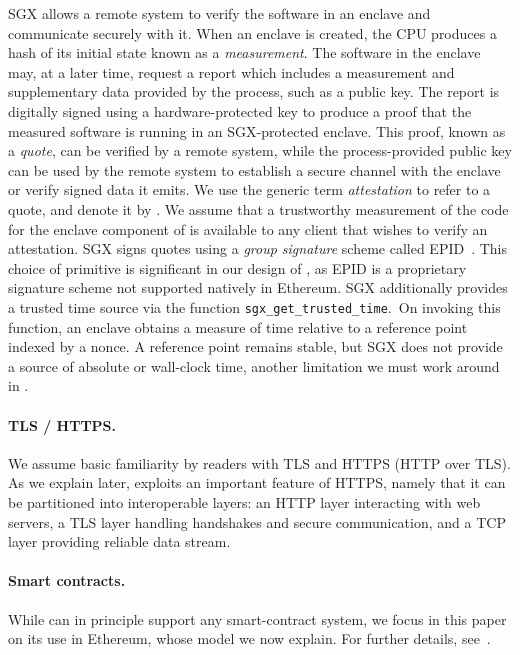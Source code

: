 SGX allows a remote system to verify the software in an enclave and communicate securely with it.
When an enclave is created, the CPU produces a hash of its initial state known as a {\em measurement}.
The software in the enclave may, at a later time, request a report which includes a measurement and supplementary data provided by the process, such as a public key.
The report is digitally signed using a hardware-protected key to produce a proof that the measured software is running in an SGX-protected enclave.
This proof, known as a {\em quote}, can be verified by a remote system, while the process-provided public key can be used by the remote system to establish a secure channel with the enclave or verify signed data it emits.
We use the generic term {\em attestation} to refer to a quote, and denote it by \att.
We assume that a trustworthy measurement of the code for the enclave component of \tc is available to any client that wishes to verify an attestation.
SGX signs quotes using a \emph{group signature} scheme called EPID~\cite{epid}.
This choice of primitive is significant in our design of \tcs, as EPID is a proprietary signature scheme not supported natively in Ethereum.
SGX additionally provides a trusted time source via the function \texttt{sgx\_get\_trusted\_time}.~On invoking this function, an enclave obtains a measure of time relative to a reference point indexed by a nonce.
A reference point remains stable, but SGX does not provide a source of absolute or wall-clock time, another limitation we must work around in \tc.

\paragraph{\bf TLS / HTTPS.}
We assume basic familiarity by readers with TLS and HTTPS (HTTP over TLS). As we explain later, \tc exploits an important feature of HTTPS, namely that it can be partitioned into interoperable layers: an HTTP layer interacting with web servers, a TLS layer handling handshakes and secure communication, and a TCP layer providing reliable data stream. 

\paragraph{\bf Smart contracts.}
\label{sec:contracts-and-gas}
While \tc can in principle support any smart-contract system, we focus in this paper on its use in Ethereum, whose model we now explain. For further details, see~\cite{whitepaper,yellowpaper}.

